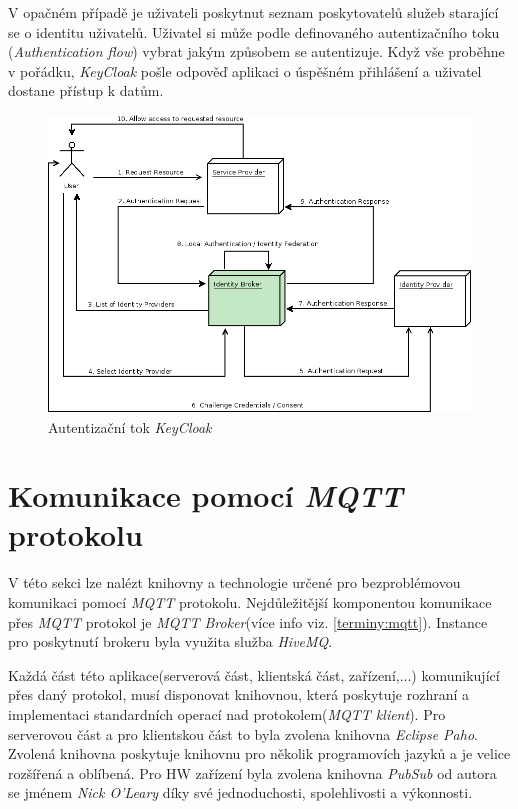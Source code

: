 V opačném případě je uživateli poskytnut seznam poskytovatelů služeb starající se o identitu uživatelů.
Uživatel si může podle definovaného autentizačního toku (\emph{Authentication flow}) vybrat jakým způsobem se autentizuje. Když vše proběhne v pořádku, \emph{KeyCloak} pošle odpověď aplikaci o úspěšném přihlášení a uživatel dostane přístup k datům.

\begin{figure}[hbt]
  \centering
  \includegraphics[width=.8 \linewidth]{obrazky-figures/keycloak_flow.png}
  \caption{Autentizační tok \emph{KeyCloak}}
  \label{figure:keycloak_flow}
\end{figure}

\section{Komunikace pomocí \emph{MQTT} protokolu}
\label{pouzite:mqtt}

V této sekci lze nalézt knihovny a technologie určené pro bezproblémovou komunikaci pomocí \emph{MQTT} protokolu.
Nejdůležitější komponentou komunikace přes \emph{MQTT} protokol je \emph{MQTT Broker}(více info viz. \ref{terminy:mqtt}).
Instance pro poskytnutí brokeru byla využita služba \emph{HiveMQ}.

Každá část této aplikace(serverová část, klientská část, zařízení,...) komunikující přes daný protokol, musí disponovat knihovnou, která poskytuje rozhraní a implementaci standardních operací nad protokolem(\emph{MQTT klient}).
Pro serverovou část a pro klientskou část to byla zvolena knihovna \emph{Eclipse Paho}. Zvolená knihovna poskytuje knihovnu pro několik programovích jazyků a je velice rozšířená a oblíbená.
Pro HW zařízení byla zvolena knihovna \emph{PubSub} od autora se jménem \emph{Nick O'Leary} díky své jednoduchosti, spolehlivosti a výkonnosti.

